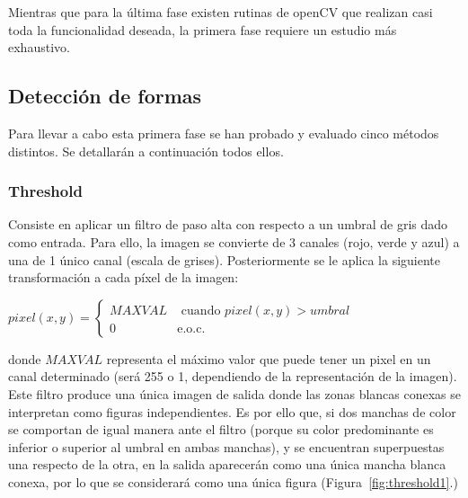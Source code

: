 {	Mientras que para la última fase existen rutinas de openCV que realizan casi toda la funcionalidad deseada, la primera fase requiere un estudio más exhaustivo.\\
	
	\subsection{Detección de formas}
	
	Para llevar a cabo esta primera fase se han probado y evaluado cinco métodos distintos. Se detallarán a continuación todos ellos.
	
	\subsubsection{Threshold}
	
	Consiste en aplicar un filtro de paso alta con respecto a un umbral de gris dado como entrada. Para ello, la imagen se convierte de 3 canales (rojo, verde y azul) a una de 1 único canal (escala de grises). Posteriormente se le aplica la siguiente transformación a cada píxel de la imagen:

	\begin{center}
		$pixel(x,y) = \left\{
		\begin{array}{cc}
		MAXVAL 	& \text{ cuando } pixel(x,y) > umbral\\ 
		0 	    & 	\text{e.o.c.}
		\end{array}\right.$
	\end{center}

	donde $MAXVAL$ representa el máximo valor que puede tener un pixel en un canal determinado (será 255 o 1, dependiendo de la representación de la imagen).\\
	
	Este filtro produce una única imagen de salida donde las zonas blancas conexas se interpretan como figuras independientes. Es por ello que, si dos manchas de color se comportan de igual manera ante el filtro (porque su color predominante es inferior o superior al umbral en ambas manchas), y se encuentran superpuestas una respecto de la otra, en la salida aparecerán como una única mancha blanca conexa, por lo que se considerará como una única figura (Figura~\ref{fig:threshold1}.)\\
	
}
